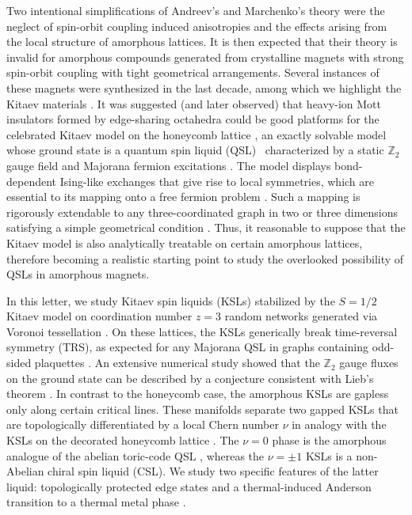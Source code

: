 Two intentional simplifications of Andreev's and Marchenko's theory were
the neglect of spin-orbit coupling induced anisotropies and the effects
arising from the local structure of amorphous lattices. It is then
expected that their theory is invalid for amorphous compounds generated
from crystalline magnets with strong spin-orbit coupling with tight
geometrical arrangements. Several instances of these magnets were
synthesized in the last decade, among which we highlight the Kitaev
materials
\autocite{Jackeli2009,HerrmannsAnRev2018,Winter2017,TrebstPhysRep2022,Takagi2019}.
It was suggested (and later observed) that heavy-ion Mott insulators
formed by edge-sharing octahedra could be good platforms for the
celebrated Kitaev model on the honeycomb lattice \autocite{Jackeli2009},
an exactly solvable model whose ground state is a quantum spin liquid
(QSL)~\autocite{Anderson1973,Knolle2019,Savary2016,Lacroix2011}
characterized by a static \(\mathbb Z_2\) gauge field and Majorana
fermion excitations \autocite{kitaevAnyonsExactlySolved2006}. The model
displays bond-dependent Ising-like exchanges that give rise to local
symmetries, which are essential to its mapping onto a free fermion
problem \autocite{Baskaran2007,Baskaran2008}. Such a mapping is
rigorously extendable to any three-coordinated graph in two or three
dimensions satisfying a simple geometrical condition
\autocite{Nussinov2009,OBrienPRB2016,yaoExactChiralSpin2007,Peri2020}.
Thus, it reasonable to suppose that the Kitaev model is also
analytically treatable on certain amorphous lattices, therefore becoming
a realistic starting point to study the overlooked possibility of QSLs
in amorphous magnets.

In this letter, we study Kitaev spin liquids (KSLs) stabilized by the
\(S=1/2\) Kitaev model \autocite{kitaevAnyonsExactlySolved2006} on
coordination number \(z=3\) random networks generated via Voronoi
tessellation
\autocite{mitchellAmorphousTopologicalInsulators2018,marsalTopologicalWeaireThorpeModels2020}.
On these lattices, the KSLs generically break time-reversal symmetry
(TRS), as expected for any Majorana QSL in graphs containing odd-sided
plaquettes
\autocite{Chua2011,ChuaPRB2011,Fiete2012,Natori2016,Wu2009,WangHaoranPRB2021}.
An extensive numerical study showed that the \(\mathbb Z_2\) gauge
fluxes on the ground state can be described by a conjecture consistent
with Lieb's theorem \autocite{lieb_flux_1994}. In contrast to the
honeycomb case, the amorphous KSLs are gapless only along certain
critical lines. These manifolds separate two gapped KSLs that are
topologically differentiated by a local Chern number \(\nu\)
\autocite{peru_preprint,mitchellAmorphousTopologicalInsulators2018} in
analogy with the KSLs on the decorated honeycomb lattice
\autocite{yaoExactChiralSpin2007}. The \(\nu=0\) phase is the amorphous
analogue of the abelian toric-code QSL
\autocite{kitaev_fault-tolerant_2003}, whereas the \(\nu=\pm1\) KSLs is
a non-Abelian chiral spin liquid (CSL). We study two specific features
of the latter liquid: topologically protected edge states and a
thermal-induced Anderson transition to a thermal metal phase
\autocite{selfThermallyInducedMetallic2019}.

